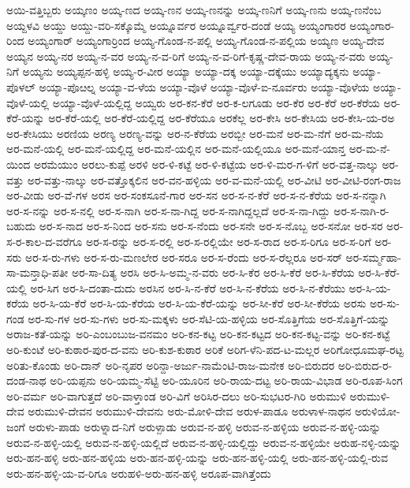 ಅಯಿ-ವತ್ತಿಬ್ಬರು
ಅಯ್ಕಣಂ
ಅಯ್ಕ-ಣದ
ಅಯ್ಕ-ಣನ
ಅಯ್ಕ-ಣನನ್ನು
ಅಯ್ಕ-ಣನಿಗೆ
ಅಯ್ಕ-ಣನು
ಅಯ್ಕ-ಣನೆಂಬ
ಅಯ್ದಳವಿ
ಅಯ್ದು
ಅಯ್ದು-ವರಿ-ಸಕ್ಕೊಮ್ಮೆ
ಅಯ್ನೂರ್ವರ
ಅಯ್ನೂರ್ವ್ವರ-ದಂಡೆ
ಅಯ್ಯ
ಅಯ್ಯಂಗಾರರ
ಅಯ್ಯಂಗಾರ-ರಿಂದ
ಅಯ್ಯಂಗಾರ್
ಅಯ್ಯಂಗಾರ್ರಿಂದ
ಅಯ್ಯ-ಗೊಂಡ-ನ-ಪಲ್ಲಿ
ಅಯ್ಯ-ಗೊಂಡ-ನ-ಪಲ್ಲಿಯ
ಅಯ್ಯಣ
ಅಯ್ಯ-ದೇವ
ಅಯ್ಯನ
ಅಯ್ಯ-ನರ
ಅಯ್ಯ-ನ-ವರ
ಅಯ್ಯ-ನ-ವ-ರಿಗೆ
ಅಯ್ಯ-ನ-ವ-ರಿಗೆ-ಕೃಷ್ಣ-ದೇವ-ರಾಯ
ಅಯ್ಯ-ನ-ವರು
ಅಯ್ಯ-ನಿಗೆ
ಅಯ್ಯನು
ಅಯ್ಯಪ್ಪನ-ಹಳ್ಳಿ
ಅಯ್ಯ-ರ-ವೀರ
ಅಯ್ಯಾ
ಅಯ್ಯಾ-ದಕ್ಕ
ಅಯ್ಯಾ-ದಕ್ಕೆಯು
ಅಯ್ಯಾದ್ಯಕ್ಕನು
ಅಯ್ಯಾ-ಪೊಳಲ್
ಅಯ್ಯಾ-ಪೊೞಲ್ನ
ಅಯ್ಯಾ-ವ-ಳೆಯ
ಅಯ್ಯಾ-ವೊಳೆ
ಅಯ್ಯಾ-ವೊಳೆ-ಐ-ನೂರ್ವರು
ಅಯ್ಯಾ-ವೊಳೆಯ
ಅಯ್ಯಾ-ವೊಳೆ-ಯಲ್ಲಿ
ಅಯ್ಯಾ-ವೊಳೆ-ಯಲ್ಲಿದ್ದ
ಅಯ್ವರು
ಅರ-ಕನ-ಕೆರೆ
ಅರ-ಕ-ಲಗೂಡು
ಅರ-ಕೆರ
ಅರ-ಕೆರೆ
ಅರ-ಕೆರೆಯ
ಅರ-ಕೆರೆ-ಯನ್ನು
ಅರ-ಕೆರೆ-ಯಲ್ಲಿ
ಅರ-ಕೆರೆ-ಯಲ್ಲಿದ್ದ
ಅರ-ಕೆರೆಯೂ
ಅರಕೆಲ್ಲ
ಅರ-ಕೇಸಿ
ಅರ-ಕೇಸಿಯ
ಅರ-ಕೇಸಿ-ಯ-ರಅ
ಅರ-ಕೇಸಿಯು
ಅರಣಿಯ
ಅರಣ್ಯ
ಅರಣ್ಯ-ವನ್ನು
ಅರ-ನ-ಕೆರೆಯ
ಅರಬ್ಬೀ
ಅರ-ಮನೆ
ಅರ-ಮ-ನೆಗೆ
ಅರ-ಮ-ನೆಯ
ಅರ-ಮನೆ-ಯಲ್ಲಿ
ಅರ-ಮನೆ-ಯಲ್ಲಿದ್ದ
ಅರ-ಮನೆ-ಯಲ್ಲಿನ
ಅರ-ಮನೆ-ಯಲ್ಲಿಯೂ
ಅರ-ಮನೆ-ಯಾನ್ತ
ಅರ-ಮ-ನೆ-ಯಿಂದ
ಅರಮೆಯುಂ
ಅರಲು-ಕುಪ್ಪೆ
ಅರಳಿ
ಅರ-ಳಿ-ಕಟ್ಟೆ
ಅರ-ಳಿ-ಕಟ್ಟೆಯ
ಅರ-ಳಿ-ಮರ-ಗ-ಳಿಗೆ
ಅರ-ವತ್ತ-ನಾಲ್ಕು
ಅರ-ವತ್ತು
ಅರ-ವತ್ತು-ನಾಲ್ಕು
ಅರ-ವತ್ತೊಕ್ಕಲಿನ
ಅರ-ವನ-ಹಳ್ಳಿಯ
ಅರ-ವ-ಮನೆ-ಯಲ್ಲಿ
ಅರ-ವೀಟಿ
ಅರ-ವೀಟಿ-ರಂಗ-ರಾಜ
ಅರ-ವೀಡು
ಅರ-ವೆ-ಗಳ
ಅರಸ
ಅರ-ಸಂಕಸೂನೆ-ಗಾರ
ಅರ-ಸನ
ಅರ-ಸ-ನ-ಕೆರೆ
ಅರ-ಸ-ನ-ಕೆರೆಯ
ಅರ-ಸ-ನನ್ನಾಗಿ
ಅರ-ಸ-ನನ್ನು
ಅರ-ಸ-ನಲ್ಲಿ
ಅರ-ಸ-ನಾಗಿ
ಅರ-ಸ-ನಾ-ಗಿದ್ದ
ಅರ-ಸ-ನಾಗಿದ್ದಲ್ಲದೆ
ಅರ-ಸ-ನಾ-ಗಿದ್ದು
ಅರ-ಸ-ನಾಗಿ-ರ-ಬಹುದು
ಅರ-ಸ-ನಾದ
ಅರ-ಸ-ನಿಂದ
ಅರ-ಸನು
ಅರ-ಸ-ನೆಂದು
ಅರ-ಸನೇ
ಅರ-ಸ-ನೊಬ್ಬ
ಅರ-ಸನೋ
ಅರ-ಸರ
ಅರ-ಸ-ರ-ಕಾಲ-ದ-ವರೆಗೂ
ಅರ-ಸ-ರನ್ನು
ಅರ-ಸ-ರಲ್ಲಿ
ಅರ-ಸ-ರಲ್ಲಿಯೇ
ಅರ-ಸ-ರಾದ
ಅರ-ಸ-ರಿಗೂ
ಅರ-ಸ-ರಿಗೆ
ಅರ-ಸರು
ಅರ-ಸ-ರು-ಗಳು
ಅರ-ಸ-ರು-ಮಣಲೇರ
ಅರ-ಸರೂ
ಅರ-ಸ-ರೆಂದು
ಅರ-ಸ-ರೆಲ್ಲರೂ
ಅರ-ಸರ್
ಅರ-ಸರ್ಮ್ಮಹಾ-ಸಾ-ಮನ್ತಾಧಿ-ಪತೀ
ಅರ-ಸಾ-ದಿತ್ಯ
ಅರಸಿ
ಅರ-ಸಿ-ಅಮ್ಮ-ನ-ವರು
ಅರ-ಸಿ-ಕೆರ
ಅರ-ಸಿ-ಕೆರೆ
ಅರ-ಸಿ-ಕೆರೆಯ
ಅರ-ಸಿ-ಕೆರೆ-ಯಲ್ಲಿ
ಅರ-ಸಿಗ
ಅರ-ಸಿ-ದಂತಾ-ದುದು
ಅರಸಿನ
ಅರ-ಸಿ-ನ-ಕೆರೆ
ಅರ-ಸಿ-ನ-ಕೆರೆಯ
ಅರ-ಸಿ-ನ-ಕೆರೆಯು
ಅರ-ಸಿ-ಯ-ಕರೆಯ
ಅರ-ಸಿ-ಯ-ಕೆರೆ
ಅರ-ಸಿ-ಯ-ಕೆರೆಯ
ಅರ-ಸಿ-ಯ-ಕೆರೆ-ಯನ್ನು
ಅರ-ಸೀ-ಕೆರೆ
ಅರ-ಸೀ-ಕೆರೆಯ
ಅರಸು
ಅರ-ಸು-ಗಂಡ
ಅರ-ಸು-ಗಳ
ಅರ-ಸು-ಗಳು
ಅರ-ಸು-ಮಕ್ಕಳು
ಅರ-ಸೆಟಿ-ಯ-ಹಳ್ಳಿಯ
ಅರ-ಸೊತ್ತಿಗೆಯ
ಅರ-ಸೊತ್ತಿಗೆ-ಯನ್ನು
ಅರಾಜ-ಕತೆ-ಯನ್ನು
ಅರಿ-ಎಂಬಂಬುಜ-ವನಮಂ
ಅರಿ-ಕನ-ಕಟ್ಟ
ಅರಿ-ಕನ-ಕಟ್ಟದ
ಅರಿ-ಕನ-ಕಟ್ಟ-ವನ್ನು
ಅರಿ-ಕನ-ಕಟ್ಟೆ
ಅರಿ-ಕುಂಟೆ
ಅರಿ-ಕುಠಾರ-ಪುರ-ದ-ವನು
ಅರಿ-ಕುಶ-ಕುಠಾರ
ಅರಿಕೆ
ಅರಿಗ-ಳೆನಿ-ಪದ-ಟ-ಮಲ್ಲರ
ಅರಿಗೋಧೂಮಘ-ರಟ್ಟ
ಅರಿತು-ಕೊಂಡು
ಅರಿ-ದಾನ್
ಅರಿ-ನೃಪರ
ಅರಿನ್ದಾ-ಅರ್ಜು-ನಾಮೆಂಟಿ-ರಾಜ-ಮನೇಕ
ಅರಿ-ಬಿರುದರ
ಅರಿ-ಬಿರುದ-ರ-ದಂಡ-ನಾಥ
ಅರಿ-ಯಪ್ಪನು
ಅರಿ-ಯಮ್ಮ-ಸೆಟ್ಟಿ
ಅರಿ-ಯೂರಿನ
ಅರಿ-ರಾಯ-ದಟ್ಟ
ಅರಿ-ರಾಯ-ವಿಭಾಡ
ಅರಿ-ರೂಪ-ಸಿಂಗ
ಅರಿ-ವರ್ಮ
ಅರಿ-ವಾಗುತ್ತದೆ
ಅರಿ-ವಾಳ್ತಾಂಡ
ಅರಿ-ವಿಗೆ
ಅರಿಸಿರ-ದಲು
ಅರಿ-ಸುಭಟರ-ಗಿರಿ
ಅರುಮುಳಿ
ಅರುಮುಳಿ-ದೇವ
ಅರುಮುಳಿ-ದೇವನ
ಅರುಮುಳಿ-ದೇವನು
ಅರು-ಮೋಳಿ-ದೇವ
ಅರುಳ-ಪಾಡೂ
ಅರುಳಾಳ-ನಾಥನ
ಅರುಳಿಯೋ-ಜಂಗೆ
ಅರುಳು-ಪಾಡು
ಅರುಳ್ನಾದ-ನಿಗೆ
ಅರುಳ್ಪಾಡು
ಅರುವ-ನ-ಹಳ್ಳಿ
ಅರುವ-ನ-ಹಳ್ಳಿಯ
ಅರುವ-ನ-ಹಳ್ಳಿ-ಯನ್ನು
ಅರುವ-ನ-ಹಳ್ಳಿ-ಯಲ್ಲಿ
ಅರುವ-ನ-ಹಳ್ಳಿ-ಯಲ್ಲಿದೆ
ಅರುವ-ನ-ಹಳ್ಳಿ-ಯಲ್ಲಿದ್ದು
ಅರುವ-ನ-ಹಳ್ಳಿಯೇ
ಅರುಹ-ನಳ್ಳಿ-ಯನ್ನು
ಅರು-ಹನ-ಹಳ್ಳಿ
ಅರು-ಹನ-ಹಳ್ಳಿಯ
ಅರು-ಹನ-ಹಳ್ಳಿ-ಯನ್ನು
ಅರು-ಹನ-ಹಳ್ಳಿ-ಯಲ್ಲಿ
ಅರು-ಹನ-ಹಳ್ಳಿ-ಯಲ್ಲಿ-ರುವ
ಅರು-ಹನ-ಹಳ್ಳಿ-ಯ-ವ-ರಿಗೂ
ಅರುಹಳಿ-ಅರು-ಹನ-ಹಳ್ಳಿ
ಅರೂಪ-ವಾಗಿತ್ತೆಂದು
